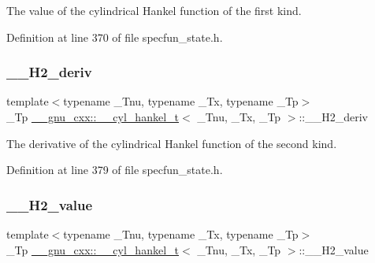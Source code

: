 The value of the cylindrical Hankel function of the first kind. 



Definition at line 370 of file specfun\+\_\+state.\+h.

\mbox{\label{struct____gnu__cxx_1_1____cyl__hankel__t_aac63a9d78d5e3ee6520073963da4cbbb}} 
\subsubsection{\texorpdfstring{\+\_\+\+\_\+\+H2\+\_\+deriv}{\_\_H2\_deriv}}
{\footnotesize\ttfamily template$<$typename \+\_\+\+Tnu, typename \+\_\+\+Tx, typename \+\_\+\+Tp$>$ \\
\+\_\+\+Tp \hyperlink{struct____gnu__cxx_1_1____cyl__hankel__t}{\+\_\+\+\_\+gnu\+\_\+cxx\+::\+\_\+\+\_\+cyl\+\_\+hankel\+\_\+t}$<$ \+\_\+\+Tnu, \+\_\+\+Tx, \+\_\+\+Tp $>$\+::\+\_\+\+\_\+\+H2\+\_\+deriv}



The derivative of the cylindrical Hankel function of the second kind. 



Definition at line 379 of file specfun\+\_\+state.\+h.

\mbox{\label{struct____gnu__cxx_1_1____cyl__hankel__t_a968496d4d370d39f2034657f32860faa}} 
\subsubsection{\texorpdfstring{\+\_\+\+\_\+\+H2\+\_\+value}{\_\_H2\_value}}
{\footnotesize\ttfamily template$<$typename \+\_\+\+Tnu, typename \+\_\+\+Tx, typename \+\_\+\+Tp$>$ \\
\+\_\+\+Tp \hyperlink{struct____gnu__cxx_1_1____cyl__hankel__t}{\+\_\+\+\_\+gnu\+\_\+cxx\+::\+\_\+\+\_\+cyl\+\_\+hankel\+\_\+t}$<$ \+\_\+\+Tnu, \+\_\+\+Tx, \+\_\+\+Tp $>$\+::\+\_\+\+\_\+\+H2\+\_\+value}



